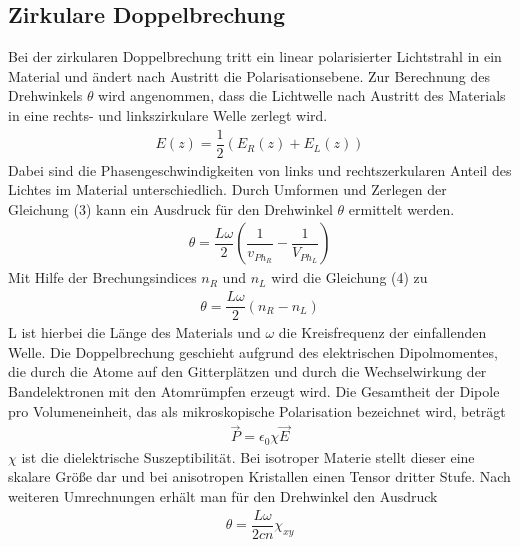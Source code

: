 \documentclass{article}
\begin{document}
\subsection{Zirkulare Doppelbrechung}
Bei der zirkularen Doppelbrechung tritt ein linear polarisierter Lichtstrahl in ein Material und ändert nach Austritt die Polarisationsebene. Zur Berechnung des Drehwinkels $\theta$ wird angenommen, dass die Lichtwelle nach Austritt des Materials in eine rechts- und linkszirkulare Welle zerlegt wird. 
\begin{align}
E(z)=\dfrac{1}{2}(E_R(z)+E_L(z))
\end{align}
Dabei sind die Phasengeschwindigkeiten von links und rechtszerkularen Anteil des Lichtes im Material unterschiedlich. Durch Umformen und Zerlegen der Gleichung (3) kann ein Ausdruck für den Drehwinkel $\theta$ ermittelt werden. 
\begin{align}
\theta= \dfrac{L\omega}{2} \left(\dfrac{1}{v_{Ph_R}}-\dfrac{1}{V_{Ph_L}}\right)
\end{align}
Mit Hilfe der Brechungsindices $n_R$ und $n_L$ wird die Gleichung (4) zu
\begin{align}
\theta= \dfrac{L\omega}{2} (n_R-n_L)
\end{align}
L ist hierbei die Länge des Materials und $\omega$ die Kreisfrequenz der einfallenden Welle. Die Doppelbrechung geschieht aufgrund des elektrischen Dipolmomentes, die durch die Atome auf den Gitterplätzen und durch die Wechselwirkung der Bandelektronen mit den Atomrümpfen erzeugt wird. Die Gesamtheit der Dipole pro Volumeneinheit, das als mikroskopische Polarisation bezeichnet wird, beträgt
\begin{align}
\vec{P}=\epsilon_0 \chi \vec{E}
\end{align}
$\chi$ ist die dielektrische Suszeptibilität. Bei isotroper Materie stellt dieser eine skalare Größe dar und bei anisotropen Kristallen einen Tensor dritter Stufe. Nach weiteren Umrechnungen erhält man für den Drehwinkel den Ausdruck 
\begin{align}
\theta= \dfrac{L\omega}{2cn}\chi_{xy    }
\end{align}
\end{document}
